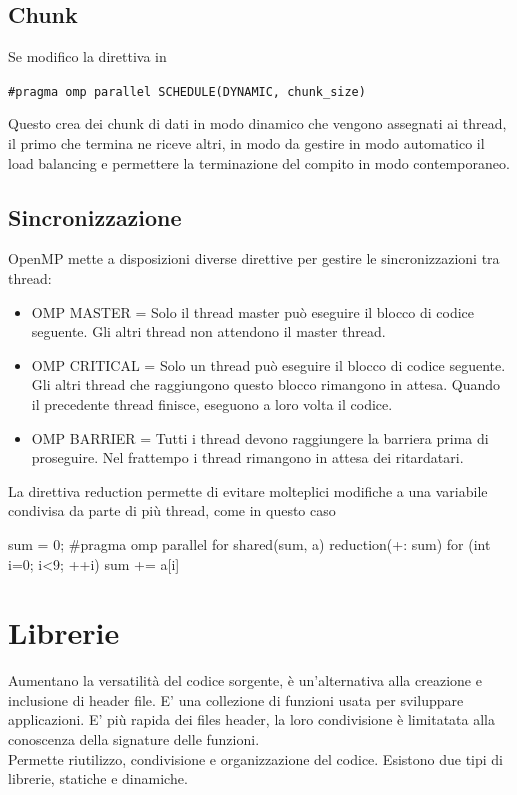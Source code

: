 \section{Chunk}
Se modifico la direttiva in 

\begin{tcolorbox}
\verb|#pragma omp parallel SCHEDULE(DYNAMIC, chunk_size)|
\end{tcolorbox}

Questo crea dei chunk di dati in modo dinamico  che vengono assegnati ai thread, il primo che termina ne riceve altri, in modo da gestire in modo automatico il load balancing e permettere la terminazione del compito in modo contemporaneo.

\section{Sincronizzazione}
OpenMP mette a disposizioni diverse direttive per gestire le
sincronizzazioni tra thread:

\begin{itemize}
\item OMP MASTER = Solo il thread master può eseguire il blocco di codice seguente. Gli altri thread non attendono il master thread.
\item OMP CRITICAL = Solo un thread può eseguire il blocco di codice seguente. Gli altri thread che raggiungono questo blocco rimangono in attesa. Quando il precedente thread finisce, eseguono a loro volta il codice.
\item OMP BARRIER = Tutti i thread devono raggiungere la barriera prima di proseguire. Nel frattempo i thread rimangono in attesa dei ritardatari.
\end{itemize}

La direttiva reduction permette di evitare molteplici modifiche a una variabile condivisa da parte di più thread, come in questo caso

\begin{cpp}
sum = 0;
#pragma omp parallel for shared(sum, a) reduction(+: sum)
for (int i=0; i<9; ++i){
	sum += a[i]
}
\end{cpp}

\chapter{Librerie}
Aumentano la versatilità del codice sorgente, è un'alternativa alla creazione e inclusione di header file. E' una collezione di funzioni usata per sviluppare applicazioni. E' più rapida dei files header, la loro condivisione è limitatata alla conoscenza della signature delle funzioni.\\
Permette riutilizzo, condivisione e organizzazione del codice.
Esistono due tipi di librerie, statiche e dinamiche. 

